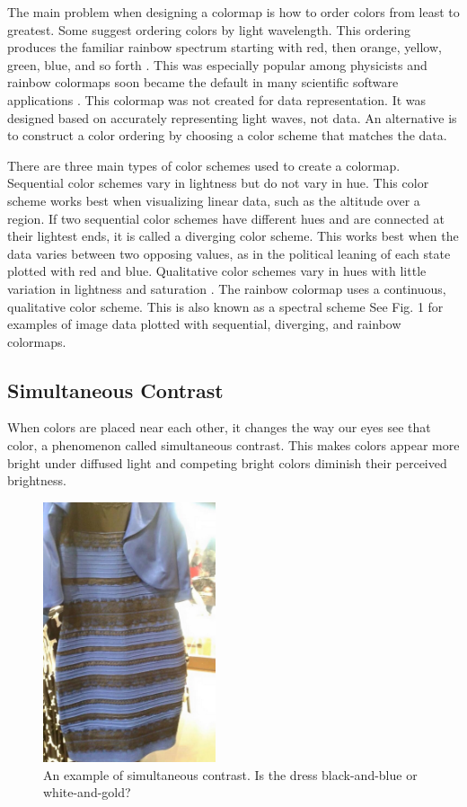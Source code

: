 \documentclass[journal,12pt]{IEEEtran}
\begin{document}
The main problem
when designing a colormap is how to order colors
from least to greatest. Some suggest
ordering colors by light wavelength. 
This ordering produces the familiar rainbow spectrum
starting with red, then orange,
yellow, green, blue, and so forth \cite{colormapping}.
This was especially popular among physicists and rainbow colormaps soon became the default
in many scientific software applications \cite{rainbowstill,matlab}.
This colormap was not created for data representation. It was designed based
on accurately representing light waves, not data.
An alternative is to construct a color ordering by choosing a color scheme that matches the data.

There are three main types of color schemes used to create a colormap.
Sequential color schemes vary in lightness but do not
vary in hue. This color scheme works best when visualizing linear data, such as the altitude over a region.
If two sequential color schemes have different hues and are
connected at their lightest ends, it is called a diverging color scheme. This works best when
the data varies between two opposing values, as in the political leaning of each state plotted 
with red and blue. Qualitative color
schemes vary in hues with little variation in lightness
and saturation \cite{colormapping}. The rainbow colormap uses a continuous,
qualitative color scheme. This is also known as a spectral scheme \cite{spectralschemes}
See Fig. 1 for examples of image data plotted with 
sequential, diverging, and rainbow colormaps.

\subsection{Simultaneous Contrast}

When colors are placed near each other, it changes the way our eyes see that color,
a phenomenon called simultaneous contrast.
This makes colors appear more bright under diffused light
and competing bright colors diminish their perceived brightness.

\begin{figure}
\centering
\includegraphics[width=2in]{colordress.png}%
\caption{An example of simultaneous contrast. Is the dress black-and-blue or white-and-gold?}
\end{figure}
\end{document}
